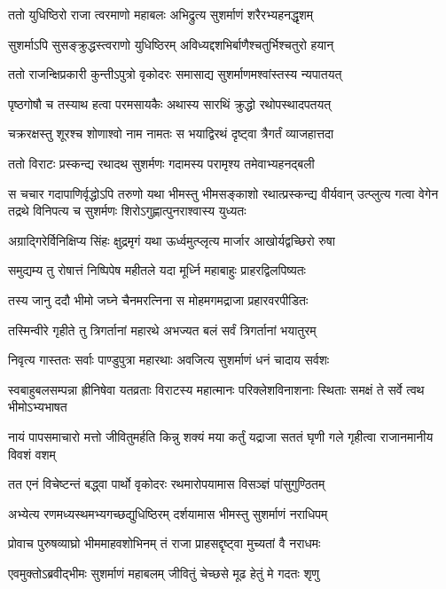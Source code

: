 \twolineshloka
{ततो युधिष्ठिरो राजा त्वरमाणो महाबलः}
{अभिद्रुत्य सुशर्माणं शरैरभ्यहनद्धृशम्}


\twolineshloka
{सुशर्माऽपि सुसङ्क्रुद्धस्त्वराणो युधिष्ठिरम्}
{अविध्यद्दशभिर्बाणैश्चतुर्भिश्चतुरो हयान्}


\twolineshloka
{ततो राजन्क्षिप्रकारी कुन्तीऽपुत्रो वृकोदरः}
{समासाद्य सुशर्माणमश्वांस्तस्य न्यपातयत्}


\twolineshloka
{पृष्ठगोषौ च तस्याथ हत्वा परमसायकैः}
{अथास्य सारथिं क्रुद्धो रथोपस्थादपतयत्}


\twolineshloka
{चक्ररक्षस्तु शूरश्च शोणाश्वो नाम नामतः}
{स भयाद्विरथं दृष्ट्वा त्रैगर्तं व्याजहात्तदा}


\twolineshloka
{ततो विराटः प्रस्कन्द्य रथादथ सुशर्मणः}
{गदामस्य परामृश्य तमेवाभ्यहनद्बली}


\onelineshloka
{स चचार गदापाणिर्वृद्धोऽपि तरुणो यथा}
\threelineshloka
{भीमस्तु भीमसङ्काशो रथात्प्रस्कन्द्य वीर्यवान्}
{उत्प्लुत्य गत्वा वेगेन तद्रथे विनिपत्य च}
{सुशर्मणः शिरोऽगुह्णात्पुनराश्वास्य युध्यतः}


\twolineshloka
{अग्राद्गिरेर्विनिक्षिप्य सिंहः क्षुद्रमृगं यथा}
{ऊर्ध्वमुत्प्लृत्य मार्जार आखोर्यद्वच्छिरो रुषा}


\twolineshloka
{समुद्यम्य तु रोषात्तं निष्पिपेष महीतले}
{यदा मूर्ध्नि महाबाहुः प्राहरद्विलपिष्यतः}


\twolineshloka
{तस्य जानु ददौ भीमो जघ्ने चैनमरत्निना}
{स मोहमगमद्राजा प्रहारवरपीडितः}


\twolineshloka
{तस्मिन्वीरे गृहीते तु त्रिगर्तानां महारथे}
{अभज्यत बलं सर्वं त्रिगर्तानां भयातुरम्}


\twolineshloka
{निवृत्य गास्ततः सर्वाः पाण्डुपुत्रा महारथाः}
{अवजित्य सुशर्माणं धनं चादाय सर्वशः}


\threelineshloka
{स्वबाहुबलसम्पन्ना ह्रीनिषेवा यतव्रताः}
{विराटस्य महात्मानः परिक्लेशविनाशनाः}
{स्थिताः समक्षं ते सर्वे त्वथ भीमोऽभ्यभाषत}


\threelineshloka
{नायं पापसमाचारो मत्तो जीवितुमर्हति}
{किन्नु शक्यं मया कर्तुं यद्राजा सततं घृणी}
{गले गृहीत्वा राजानमानीय विवशं वशम्}


\twolineshloka
{तत एनं विचेष्टन्तं बद्ध्वा पार्थो वृकोदरः}
{रथमारोपयामास विसञ्ज्ञं पांसुगुण्ठितम्}


\twolineshloka
{अभ्येत्य रणमध्यस्थमभ्यगच्छद्युधिष्ठिरम्}
{दर्शयामास भीमस्तु सुशर्माणं नराधिपम्}


\twolineshloka
{प्रोवाच पुरुषव्याघ्रो भीममाहवशोभिनम्}
{तं राजा प्राहसद्दृष्ट्वा मुच्यतां वै नराधमः}


\twolineshloka
{एवमुक्तोऽब्रवीद्भीमः सुशर्माणं महाबलम्}
{जीवितुं चेच्छसे मूढ हेतुं मे गदतः शृणु}


